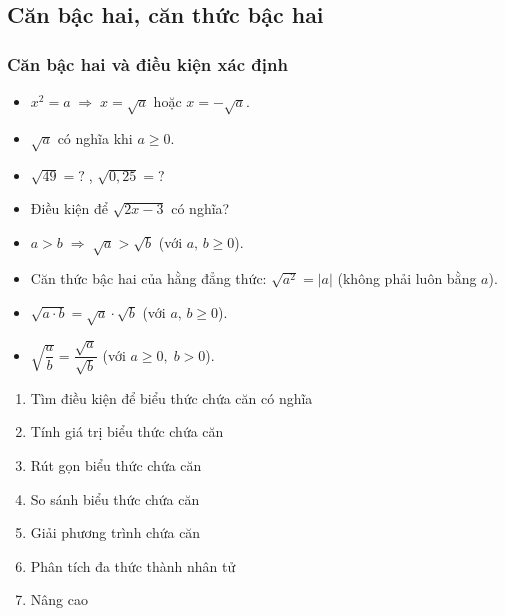 \documentclass[12pt,a4paper]{article}
\begin{document}
\subsection{Căn bậc hai, căn thức bậc hai}

\subsubsection{Căn bậc hai và điều kiện xác định}

\begin{dinhnghia}
  \begin{itemize}
    \item $x^2 = a \;\Rightarrow\; x = \sqrt{a}$ hoặc $x = -\sqrt{a}$.
    \item $\sqrt{a}$ có nghĩa khi $a \ge 0$.
  \end{itemize}
\end{dinhnghia}

\begin{vidu}
  \begin{itemize}
    \item $\sqrt{49} = ?\;$, \quad $\sqrt{0{,}25} = ?$
    \item Điều kiện để $\sqrt{2x - 3}$ có nghĩa?
  \end{itemize}
\end{vidu}

\begin{tinhchat}
  \begin{itemize}
    \item $a > b \;\Rightarrow\; \sqrt{a} > \sqrt{b}$ \quad (với $a,\, b \ge 0$).
    \item Căn thức bậc hai của hằng đẳng thức: $\sqrt{a^2} = |a|$ \quad (không phải luôn bằng $a$).
  \end{itemize}
\end{tinhchat}

\begin{congthuc}
  \begin{itemize}
    \item $\sqrt{a \cdot b} = \sqrt{a} \cdot \sqrt{b}$ \quad (với $a,\, b \ge 0$).
    \item $\sqrt{\dfrac{a}{b}} = \dfrac{\sqrt{a}}{\sqrt{b}}$ \quad (với $a \ge 0,\; b > 0$).
  \end{itemize}
\end{congthuc}

\begin{enumerate}[label=\textbf{Dạng \arabic*:}, leftmargin=*, align=left]
  \item Tìm điều kiện để biểu thức chứa căn có nghĩa
  \item Tính giá trị biểu thức chứa căn
  \item Rút gọn biểu thức chứa căn
  \item So sánh biểu thức chứa căn
  \item Giải phương trình chứa căn
  \item Phân tích đa thức thành nhân tử
  \item Nâng cao
\end{enumerate}
\end{document}
